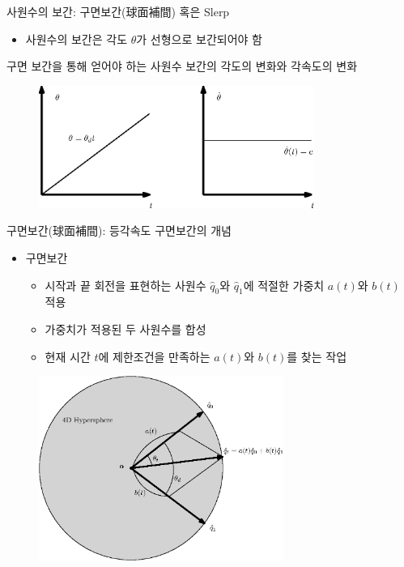 \begin{frame}[fragile]{사원수의 보간: 구면보간(球面補間) 혹은 Slerp}

\begin{itemize}
\item 사원수의 보간은 각도 $\theta$가 선형으로 보간되어야 함
\end{itemize}

구면 보간을 통해 얻어야 하는 사원수 보간의 각도의 변화와 각속도의 변화

\begin{figure}
  	\includegraphics[width=9cm]{Math_quaternion/quaternionSlerpAngle.eps}
\end{figure}

\end{frame}

\begin{frame}[fragile]{구면보간(球面補間): 등각속도 구면보간의 개념}

\begin{itemize}
\item 구면보간
	\begin{itemize}
	\item 시작과 끝 회전을 표현하는 사원수 $\hat q_0$와 $\hat q_1$에 적절한 가중치 $a(t)$와 $b(t)$ 적용
	\item 가중치가 적용된 두 사원수를 합성
	\item 현재 시간 $t$에 제한조건을 만족하는 $a(t)$와 $b(t)$를 찾는 작업
	\end{itemize}
\end{itemize}

\begin{figure}
	\includegraphics[width=8cm]{Math_quaternion/quaternionSlerp.eps}
\end{figure}

\end{frame}

